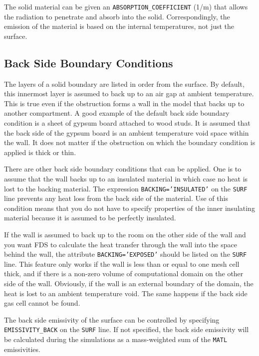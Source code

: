 \documentclass[11pt]{book}
\newcommand{\ct}{\tt\small}
\begin{document}
The solid
material can be given an {\ct ABSORPTION\_COEFFICIENT} (1/m) that allows
the radiation to penetrate and absorb into the solid. Correspondingly,
the emission of the material is based on the internal temperatures,
not just the surface.




\subsection{Back Side Boundary Conditions}
\label{info:BACKING}

The layers of a solid boundary are listed in order from the surface. By default,
this innermost layer is assumed to back up to an air gap at ambient
temperature. This is true even if the obstruction forms a wall in the model that backs up to another
compartment. A good example of the default back side boundary condition is a sheet of gypsum board attached to wood studs.
It is assumed that the back side of the gypsum board is an ambient temperature void space within the wall. It does not
matter if the obstruction on which the boundary condition is applied is thick or thin.

There are other back side boundary conditions that can be applied. One is to assume that the wall
backs up to an insulated material in which case no heat is lost to
the backing material. The expression {\ct BACKING='INSULATED'} on
the {\ct SURF} line prevents any heat loss from the back side of the material. Use of this condition
means that you  do not have to specify properties of the inner insulating material because it is assumed to
be perfectly insulated.

If the wall is assumed to back up to the room on the other side of
the wall and you want FDS to calculate the heat transfer
through the wall into the space behind the wall, the attribute
{\ct BACKING='EXPOSED'} should be listed on the {\ct SURF} line. This feature only works
if the wall is less than or equal to one mesh cell thick, and if there is a non-zero volume
of computational domain on the other side of the wall. Obviously, if
the wall is an external boundary of the domain, the heat is lost to an ambient temperature void. The same happens if the back side
gas cell cannot be found.

The back side emissivity of the surface can be controlled by specifying {\ct EMISSIVITY\_BACK} on the {\ct SURF} line. If not specified, the back side
emissivity will be calculated during the simulations as a mass-weighted sum of the {\ct MATL} emissivities.
\end{document}
